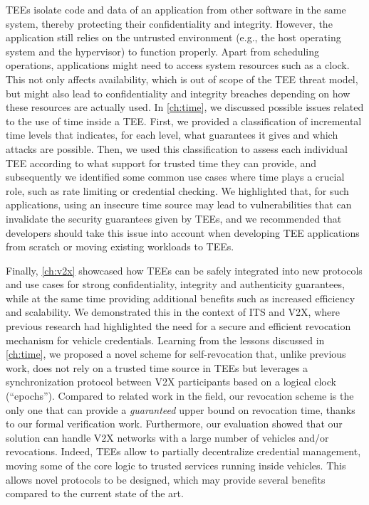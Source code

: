 \acp{TEE} isolate code and data of an application from other software in the
same system, thereby protecting their confidentiality and integrity. However,
the application still relies on the untrusted environment (e.g., the host
operating system and the hypervisor) to function properly. Apart from scheduling
operations, applications might need to access system resources such as a clock.
This not only affects availability, which is out of scope of the \ac{TEE} threat
model, but might also lead to confidentiality and integrity breaches depending
on how these resources are actually used. In \cref{ch:time}, we discussed
possible issues related to the use of time inside a \ac{TEE}. First, we provided
a classification of incremental time levels that indicates, for each level, what
guarantees it gives and which attacks are possible. Then, we used this
classification to assess each individual \ac{TEE} according to what support for
trusted time they can provide, and subsequently we identified some common use
cases where time plays a crucial role, such as rate limiting or credential
checking. We highlighted that, for such applications, using an insecure time
source may lead to vulnerabilities that can invalidate the security guarantees
given by \acp{TEE}, and we recommended that developers should take this issue
into account when developing \ac{TEE} applications from scratch or moving
existing workloads to \acp{TEE}.

Finally, \cref{ch:v2x} showcased how \acp{TEE} can be safely integrated into new
protocols and use cases for strong confidentiality, integrity and authenticity
guarantees, while at the same time providing additional benefits such as
increased efficiency and scalability. We demonstrated this in the context of
\ac{ITS} and \ac{V2X}, where previous research had highlighted the need for a
secure and efficient revocation mechanism for vehicle credentials. Learning from
the lessons discussed in \cref{ch:time}, we proposed a novel scheme for
self-revocation that, unlike previous work, does not rely on a trusted time
source in \acp{TEE} but leverages a synchronization protocol between \ac{V2X}
participants based on a logical clock (``epochs''). Compared to related work in
the field, our revocation scheme is the only one that can provide a
\emph{guaranteed} upper bound on revocation time, thanks to our formal
verification work. Furthermore, our evaluation showed that our solution can
handle \ac{V2X} networks with a large number of vehicles and/or revocations.
Indeed, \acp{TEE} allow to partially decentralize credential management, moving
some of the core logic to trusted services running inside vehicles. This allows
novel protocols to be designed, which may provide several benefits compared to
the current state of the art.

